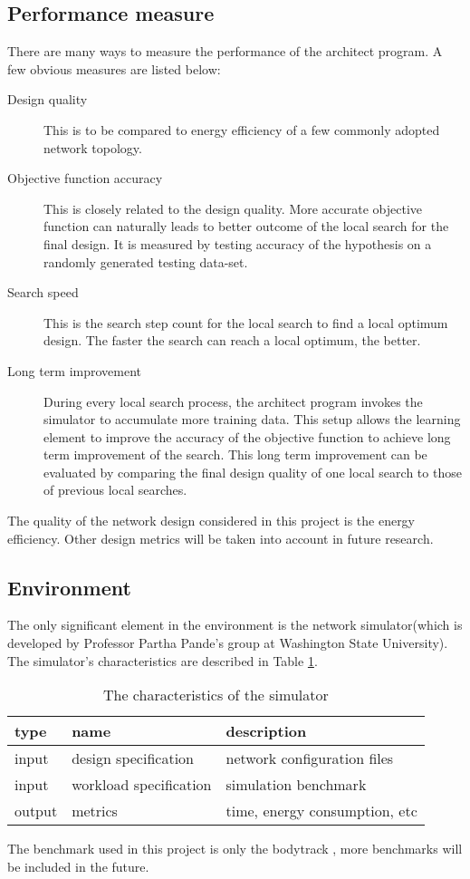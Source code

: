 \documentclass[12pt]{article}
\theoremstyle{definition}
\begin{document}
\subsection{Performance measure}
There are many ways to measure the performance of the architect program. A few obvious measures are listed below:
\begin{description}
  \item[Design quality] This is to be compared to energy efficiency of a few commonly adopted network topology.
  \item[Objective function accuracy] This is closely related to the design quality. More accurate objective function can naturally leads to better outcome of the local search for the final design. It is measured by testing accuracy of the hypothesis on a randomly generated testing data-set.
  \item[Search speed] This is the search step count for the local search to find a local optimum design. The faster the search can reach a local optimum, the better.
  \item[Long term improvement] During every local search process, the architect program invokes the simulator to accumulate more training data. This setup allows the learning element to improve the accuracy of the objective function to achieve long term improvement of the search. This long term improvement can be evaluated by comparing the final design quality of one local search to those of previous local searches.
\end{description}
The quality of the network design considered in this project is the energy efficiency. Other design metrics will be taken into account in future research.
\subsection{Environment}
The only significant element in the environment is the network simulator(which is developed by Professor Partha Pande's group at Washington State University). The simulator's characteristics are described in Table \ref{tab:environment}.
\begin{table}[htb]
  \centering
  \begin{tabularx}{\textwidth}{|l|l|X|} \hline
    type & name & description \\ \hline
    input & design specification &  network configuration files \\ \hline
    input & workload specification & simulation benchmark \\ \hline
    output & metrics & time, energy consumption, etc \\ \hline
  \end{tabularx}
  \caption{The characteristics of the simulator}
  \label{tab:environment}
\end{table}
The benchmark used in this project is only the bodytrack \cite{bienia2011benchmarking}, more benchmarks will be included in the future.
\end{document}
